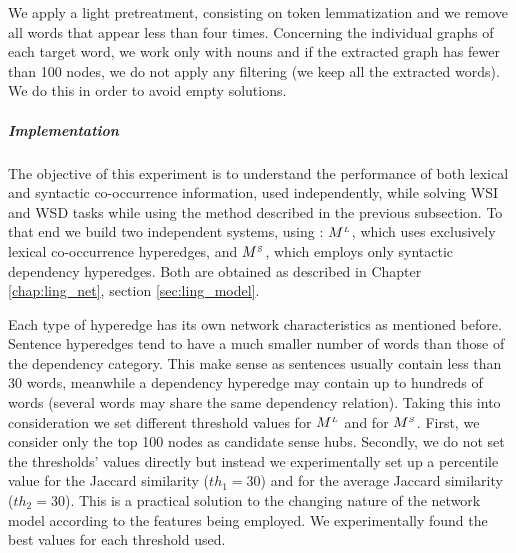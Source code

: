 We apply a light pretreatment, consisting on token lemmatization and we remove all words that appear less than four times. Concerning the individual graphs of each target word, we work only with nouns and if the extracted graph has fewer than 100 nodes, we do not apply any filtering (we keep all the extracted words). We do this in order to avoid empty solutions.



\subparagraph{Implementation}
The objective of this experiment is to understand the performance of both lexical and syntactic co-occurrence information, used independently, while solving WSI and WSD tasks while using the method described in the previous subsection. To that end we build two independent systems, using : $M^{\scriptscriptstyle L}$, which uses exclusively lexical co-occurrence hyperedges, and $M^{\scriptscriptstyle S}$, which employs only syntactic dependency hyperedges. Both are obtained as described in Chapter \ref{chap:ling_net}, section \ref{sec:ling_model}.
 
Each type of hyperedge has its own network characteristics as mentioned before. Sentence hyperedges tend to have a much smaller number of words than those of the dependency category. This make sense as sentences usually contain less than 30 words, meanwhile a dependency hyperedge may contain up to hundreds of words (several words may share the same dependency relation). Taking this into consideration we set different threshold values for $M^{\scriptscriptstyle L}$ and for $M^{\scriptscriptstyle S}$. First, we  consider only the top 100 nodes as candidate sense hubs. Secondly, we do not set the thresholds' values directly but instead we experimentally set up a percentile value for the Jaccard similarity ($th_1=30$) and for the average Jaccard similarity ($th_2=30$). This is a practical solution to the changing nature of the network model according to the features being employed. We experimentally found the best values for  each threshold used.



%




